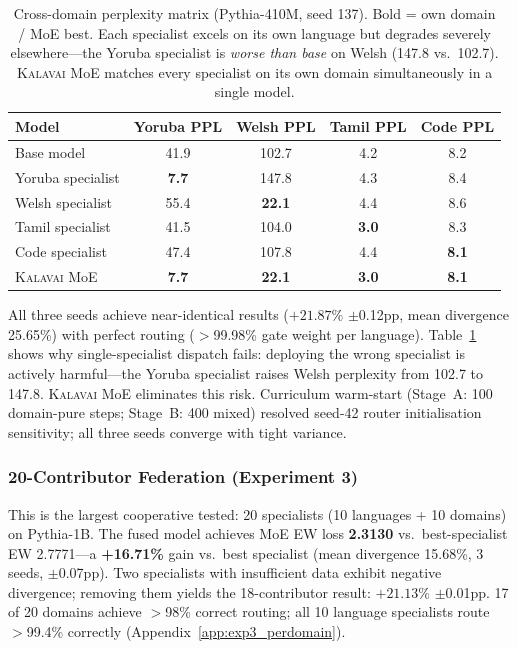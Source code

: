 \documentclass{article}
\newcommand{\kalavai}{\textsc{Kalavai}\xspace}
\begin{document}
\begin{table}[h]
\centering
\footnotesize
\setlength{\tabcolsep}{4pt}
\begin{tabular}{lcccc}
\toprule
Model & Yoruba PPL & Welsh PPL & Tamil PPL & Code PPL \\
\midrule
Base model        & 41.9          & 102.7          & 4.2          & 8.2 \\
\midrule
Yoruba specialist & \textbf{7.7}  & 147.8          & 4.3          & 8.4 \\
Welsh specialist  & 55.4          & \textbf{22.1}  & 4.4          & 8.6 \\
Tamil specialist  & 41.5          & 104.0          & \textbf{3.0} & 8.3 \\
Code specialist   & 47.4          & 107.8          & 4.4          & \textbf{8.1} \\
\midrule
\kalavai MoE      & \textbf{7.7}  & \textbf{22.1}  & \textbf{3.0} & \textbf{8.1} \\
\bottomrule
\end{tabular}
\caption{Cross-domain perplexity matrix (Pythia-410M, seed 137). Bold = own domain / MoE best. Each specialist excels on its own language but degrades severely elsewhere---the Yoruba specialist is \emph{worse than base} on Welsh (147.8 vs.\ 102.7). \kalavai MoE matches every specialist on its own domain simultaneously in a single model.}
\label{tab:crosslingual_matrix}
\end{table}

All three seeds achieve near-identical results ($+21.87\%$ $\pm$0.12pp, mean divergence 25.65\%) with perfect routing ($>$99.98\% gate weight per language). Table~\ref{tab:crosslingual_matrix} shows why single-specialist dispatch fails: deploying the wrong specialist is actively harmful---the Yoruba specialist raises Welsh perplexity from 102.7 to 147.8. \kalavai MoE eliminates this risk. Curriculum warm-start (Stage~A: 100 domain-pure steps; Stage~B: 400 mixed) resolved seed-42 router initialisation sensitivity; all three seeds converge with tight variance.

\subsubsection{20-Contributor Federation (Experiment 3)}
\label{sec:phase2_twenty}

This is the largest cooperative tested: 20 specialists (10 languages + 10 domains) on Pythia-1B. The fused model achieves MoE EW loss \textbf{2.3130} vs.\ best-specialist EW 2.7771---a \textbf{+16.71\%} gain vs.\ best specialist (mean divergence 15.68\%, 3 seeds, $\pm$0.07pp). Two specialists with insufficient data exhibit negative divergence; removing them yields the 18-contributor result: $+21.13\%$ $\pm$0.01pp. 17 of 20 domains achieve $>$98\% correct routing; all 10 language specialists route $>$99.4\% correctly (Appendix~\ref{app:exp3_perdomain}).
\end{document}
